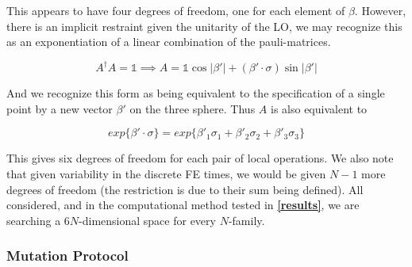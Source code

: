 \documentclass[11pt,twocolumn]{article}
\begin{document}
	This appears to have four degrees of freedom, one for each element of $\beta$. However, there is an implicit restraint given the unitarity of the LO, we may recognize this as an exponentiation of a linear combination of the pauli-matrices. 

	\begin{equation}
		A^{\dagger}A = \mathds{1} \implies A = \mathds{1}\cos{|\beta'|} + (\beta' \cdot \sigma) \sin{|\beta'|}
	\end{equation}

	And we recognize this form as being equivalent to the specification of a single point by a new vector $\beta'$ on the three sphere. Thus $A$ is also equivalent to 

	\begin{equation}
		exp\{\beta' \cdot \sigma\} = exp\{\beta'_1 \sigma_1 + \beta'_2 \sigma_2 + \beta'_3 \sigma_3 \}
	\end{equation}

	This gives six degrees of freedom for each pair of local operations. We also note that given variability in the discrete FE times, we would be given $N-1$ more degrees of freedom (the restriction is due to their sum being defined). All considered, and in the computational method tested in \textbf{\ref{results}}, we are searching a $6N$-dimensional space for every $N$-family.


	\subsubsection{Mutation Protocol}
\end{document}
